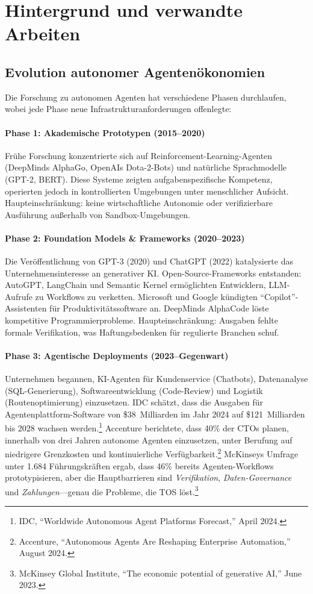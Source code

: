 \documentclass[11pt]{article}
\begin{document}
\section{Hintergrund und verwandte Arbeiten}
\subsection{Evolution autonomer Agentenökonomien}
Die Forschung zu autonomen Agenten hat verschiedene Phasen durchlaufen, wobei jede Phase neue Infrastrukturanforderungen offenlegte:

\paragraph{Phase 1: Akademische Prototypen (2015--2020)} Frühe Forschung konzentrierte sich auf Reinforcement-Learning-Agenten (DeepMinds AlphaGo, OpenAIs Dota-2-Bots) und natürliche Sprachmodelle (GPT-2, BERT). Diese Systeme zeigten aufgabenspezifische Kompetenz, operierten jedoch in kontrollierten Umgebungen unter menschlicher Aufsicht. Haupteinschränkung: keine wirtschaftliche Autonomie oder verifizierbare Ausführung außerhalb von Sandbox-Umgebungen.

\paragraph{Phase 2: Foundation Models \& Frameworks (2020--2023)} Die Veröffentlichung von GPT-3 (2020) und ChatGPT (2022) katalysierte das Unternehmensinteresse an generativer KI. Open-Source-Frameworks entstanden: AutoGPT, LangChain und Semantic Kernel ermöglichten Entwicklern, LLM-Aufrufe zu Workflows zu verketten. Microsoft und Google kündigten ``Copilot''-Assistenten für Produktivitätssoftware an. DeepMinds AlphaCode löste kompetitive Programmierprobleme. Haupteinschränkung: Ausgaben fehlte formale Verifikation, was Haftungsbedenken für regulierte Branchen schuf.

\paragraph{Phase 3: Agentische Deployments (2023--Gegenwart)} Unternehmen begannen, KI-Agenten für Kundenservice (Chatbots), Datenanalyse (SQL-Generierung), Softwareentwicklung (Code-Review) und Logistik (Routenoptimierung) einzusetzen. IDC schätzt, dass die Ausgaben für Agentenplattform-Software von \$38~Milliarden im Jahr 2024 auf \$121~Milliarden bis 2028 wachsen werden.\footnote{IDC, ``Worldwide Autonomous Agent Platforms Forecast,'' April 2024.} Accenture berichtete, dass 40\% der CTOs planen, innerhalb von drei Jahren autonome Agenten einzusetzen, unter Berufung auf niedrigere Grenzkosten und kontinuierliche Verfügbarkeit.\footnote{Accenture, ``Autonomous Agents Are Reshaping Enterprise Automation,'' August 2024.} McKinseys Umfrage unter 1.684 Führungskräften ergab, dass 46\% bereits Agenten-Workflows prototypisieren, aber die Hauptbarrieren sind \emph{Verifikation}, \emph{Daten-Governance} und \emph{Zahlungen}---genau die Probleme, die TOS löst.\footnote{McKinsey Global Institute, ``The economic potential of generative AI,'' June 2023.}
\end{document}
